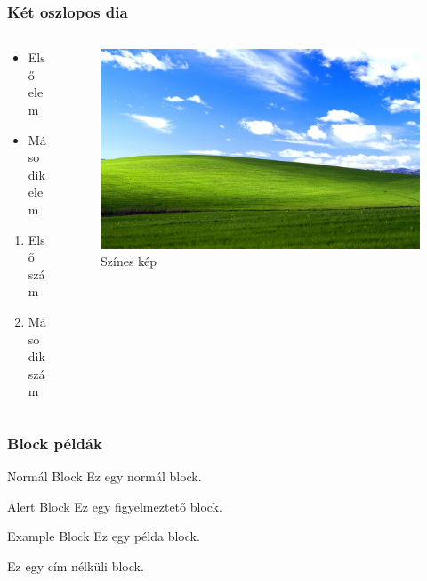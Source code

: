\documentclass[12pt,aspectratio=169]{beamer}
\begin{document}
\begin{frame}
  \frametitle{Két oszlopos dia}
  \begin{columns}[T]
    \begin{column}{0.5\textwidth}
      \begin{itemize}
        \item Első elem
        \item Második elem
      \end{itemize}
      \begin{enumerate}
        \item Első szám
        \item Második szám
      \end{enumerate}
    \end{column}
    \begin{column}{0.5\textwidth}
      \begin{figure}
        \centering
        \includegraphics[width=\textwidth]{szines.jpg} %
        \caption{Színes kép}
      \end{figure}
    \end{column}
  \end{columns}
\end{frame}

\begin{frame}
  \frametitle{Block példák}
  \begin{block}{Normál Block}
    Ez egy normál block.
  \end{block}

  \begin{alertblock}{Alert Block}
    Ez egy figyelmeztető block.
  \end{alertblock}

  \begin{exampleblock}{Example Block}
    Ez egy példa block.
  \end{exampleblock}
  
  \begin{block}{}
    Ez egy cím nélküli block.
  \end{block}
\end{frame}
\end{document}
